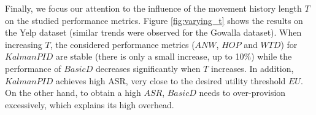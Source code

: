 \documentclass{USC-Thesis}
\newcommand{\tn}{\tabularnewline}
\numberwithin{equation}{chapter}
\begin{document}


Finally, we focus our attention to the influence of the movement history length $T$ on the studied performance metrics.
Figure \ref{fig:varying_t} shows the results on the Yelp dataset (similar trends were observed for the Gowalla dataset). When increasing $T$, the considered performance metrics ($\mathit{ANW}$, $\mathit{HOP}$ and $\mathit{WTD}$) for $\mathit{KalmanPID}$ are stable (there is only a small increase, up to 10\%) while the performance of $\mathit{BasicD}$ decreases significantly when $T$ increases. 
In addition, $\mathit{KalmanPID}$ achieves high ASR, very close to the desired utility threshold $\mathit{EU}$. On the other hand, to obtain a high $\mathit{ASR}$, $\mathit{BasicD}$ needs to over-provision excessively, which explains its high overhead.


\begin{comment}
\textbf{Redundant task assignment (Single-snapshot PSD).}

\begin{table}
\begin{center}
\footnotesize
\begin{tabular}{ l | c | c | c | c | r}
\textbf{$K$} & \textbf{$\mathit{ANW}$} & \textbf{$\mathit{HOP}$} & \textbf{$\mathit{WTD_{NN}}$} & \textbf{$\mathit{WTD_{FC}}$} & \textbf{$\mathit{CELL}$} \tn
\hline
2 & 55.1 & 16.2 & 0.24 & 0.38 & 4.6 \tn
3 & 88.1 & 23.7 & 0.28 & 0.52 & 7.0 \tn
4 & 117.4 & 28.1 & 0.32 & 0.56 & 7.8 \tn
5 & 145.2 & 30.0 & 0.37 & 0.61 & 8.5 \tn
\end{tabular}
\caption{Performance of $G$-$\mathit{GP}$-$\mathit{Hybrid}$ when varying number of workers required to complete a task  $K$ (Ye.-Linear, $\epsilon=0.4$).}
\label{tab:single_PSD_K}
\end{center}
\end{table}

\textbf{Redundant task assignment (Multiple-snapshot PSD).}

\begin{table}
\begin{center}
\footnotesize
\begin{tabular}{ l | c | c | c | c | r}
\textbf{$K$} & \textbf{$\mathit{ANW}$} & \textbf{$\mathit{HOP}$} & \textbf{$\mathit{WTD}$} & \textbf{$\mathit{ASR}$} & \textbf{$\mathit{CELL}$} \tn
\hline
2 & 63.1 & 19.8 & 0.46 & 84.5 & 0.38 \tn
3 & 94.7 & 25.3 & 0.47 & 81.4& 0.52 \tn
4 & 137.4 & 31.4 & 0.46 & 80.7 & 0.56 \tn
5 & 195.4 & 37.4 & 0.46 & 80.10& 0.61  \tn
\end{tabular}
\caption{Performance of $Kalman$-$PID$ when varying number of workers required to complete a task $K$ (Ye.-Linear, $\epsilon=0.5$).}
\label{tab:mulltiple_PSD_K}
\end{center}
\end{table}

\end{comment}
\end{document}

